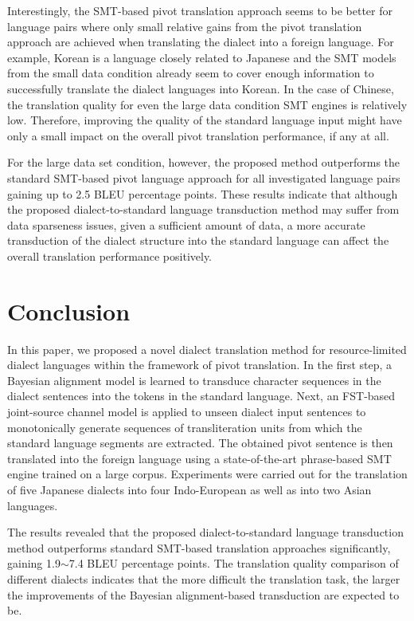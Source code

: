 \documentclass[english]{jnlp_1.4}
\begin{document}
Interestingly, the SMT-based pivot translation approach seems to be better for language pairs where only small relative gains from the pivot translation
approach are achieved when translating the dialect into a foreign language. For example, Korean is a language closely related to Japanese and the SMT models
from the small data condition already seem to cover enough information to successfully translate the dialect languages into Korean. In the case of Chinese, 
the translation quality for even the large data condition SMT engines is relatively low. Therefore, improving the quality of the standard
language input might have only a small impact on the overall pivot translation performance, if any at all.

For the large data set condition, however, the proposed method outperforms the standard SMT-based pivot language approach
for all investigated language pairs gaining up to 2.5 BLEU percentage points. These results indicate that although the proposed
dialect-to-standard language transduction method may suffer from data sparseness issues, given a sufficient amount of data,
a more accurate transduction of the dialect structure into the standard language can affect the overall translation performance positively.



\section{Conclusion}
\label{sec:conclusion}

In this paper, we proposed a novel dialect translation method for resource-limited dialect languages within the framework of
pivot translation. In the first step, a Bayesian alignment model is learned to transduce character sequences in the dialect
sentences into the tokens in the standard language. Next, an FST-based joint-source channel model is applied
to unseen dialect input sentences to monotonically generate sequences of transliteration units from which the standard language
segments are extracted. The obtained pivot sentence is then translated into the foreign language using a state-of-the-art phrase-based
SMT engine trained on a large corpus.
Experiments were carried out for the translation of five Japanese dialects into four Indo-European as well as into two Asian languages.

The results revealed that the proposed dialect-to-standard language transduction method outperforms standard SMT-based translation approaches
significantly, gaining 1.9$\sim$7.4 BLEU percentage points. The translation quality comparison of different dialects indicates that the more difficult
the translation task, the larger the improvements of the Bayesian alignment-based transduction are expected to be.
\end{document}
